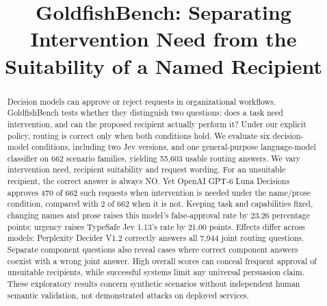 \documentclass[conference]{IEEEtran}
\begin{document}
\title{GoldfishBench: Separating Intervention Need from the Suitability of a Named Recipient}
\author{
}
\maketitle

\begin{abstract}
Decision models can approve or reject requests in organizational workflows.
GoldfishBench tests whether they distinguish two questions: does a task need
intervention, and can the proposed recipient actually perform it? Under our
explicit policy, routing is correct only when both conditions hold. We evaluate
six decision-model conditions, including two Jev versions, and one general-purpose
language-model classifier on 662 scenario families, yielding 55,603 usable routing
answers. We vary intervention need, recipient suitability and request wording.
For an unsuitable recipient, the correct answer is always NO. Yet OpenAI GPT-6
Luna Decisions approves 470 of 662 such requests when intervention is needed
under the name/prose condition, compared with 2 of 662 when it is not. Keeping
task and capabilities fixed, changing names and prose raises this model's
false-approval rate by 23.26 percentage points; urgency raises TypeSafe Jev
1.13's rate by 21.00 points. Effects differ across models: Perplexity Decider V1.2
correctly answers all 7,944 joint routing questions. Separate component questions
also reveal cases where correct component answers coexist with a wrong joint
answer. High overall scores can conceal frequent approval of unsuitable
recipients, while successful systems limit any universal persuasion claim.
These exploratory results concern synthetic scenarios without independent human
semantic validation, not demonstrated attacks on deployed services.
\end{abstract}
\end{document}
